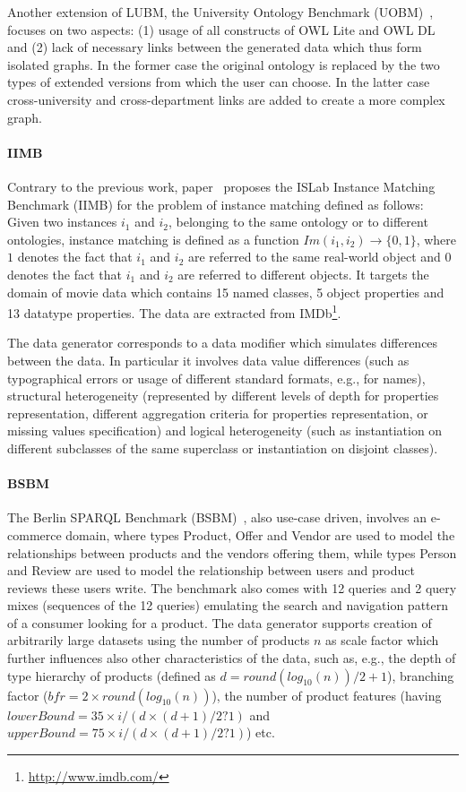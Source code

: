Another extension of LUBM, the University Ontology Benchmark (UOBM)~\cite{Ma:2006:TCO:2094613.2094629}, focuses on two aspects: (1) usage of all constructs of OWL Lite and OWL DL~\cite{owl} and (2) lack of necessary links between the generated data which thus form isolated graphs. In the former case the original ontology is replaced by the two types of extended versions from which the user can choose. In the latter case cross-university and cross-department links are added to create a more complex graph.

\paragraph{IIMB} Contrary to the previous work, paper~\cite{Ferrara08OM} proposes the ISLab Instance Matching Benchmark (IIMB) for the problem of instance matching defined as follows: Given two instances $i_1$ and $i_2$, belonging to the same ontology or to different ontologies, instance matching is defined as a function $Im(i_1, i_2) \rightarrow \{0, 1\}$,  where $1$ denotes the fact that $i_1$ and $i_2$ are referred to the same real-world object and $0$ denotes the fact that $i_1$ and $i_2$ are referred to different objects. It targets the domain of movie data which contains 15 named classes, 5 object properties and 13 datatype properties. The data are extracted from IMDb\footnote{\url{http://www.imdb.com/}}.

The data generator corresponds to a data modifier which simulates differences between the data. In particular it involves data value differences (such as typographical errors or usage of different standard formats, e.g., for names), structural heterogeneity (represented by different levels of depth for properties representation, different aggregation criteria for properties representation, or missing values specification) and logical heterogeneity (such as instantiation on different subclasses of the same superclass or instantiation on disjoint classes).


\paragraph{BSBM} The Berlin SPARQL Benchmark (BSBM)~\cite{Bizer09theberlin}, also use-case driven, involves an e-commerce domain, where types Product, Offer and Vendor are used to model the relationships between products and the vendors offering them, while types Person and Review are used to model the relationship between users and product reviews these users write.
The benchmark also comes with 12 queries and 2 query mixes (sequences of the 12 queries) emulating the search and navigation pattern of a consumer looking for a product. The data generator supports creation of arbitrarily large datasets using the number of products $n$ as scale factor which further influences also other characteristics of the data, such as, e.g., the depth of type hierarchy of products (defined as $d = round(log_{10}(n))/2 + 1$), branching factor ($bfr = 2 \times round(log_{10}(n))$), the number of product features (having $lowerBound = 35 \times i / (d \times (d+1)/2 ? 1)$ and $upperBound = 75 \times i / (d \times (d+1)/2 ? 1)$) etc.

